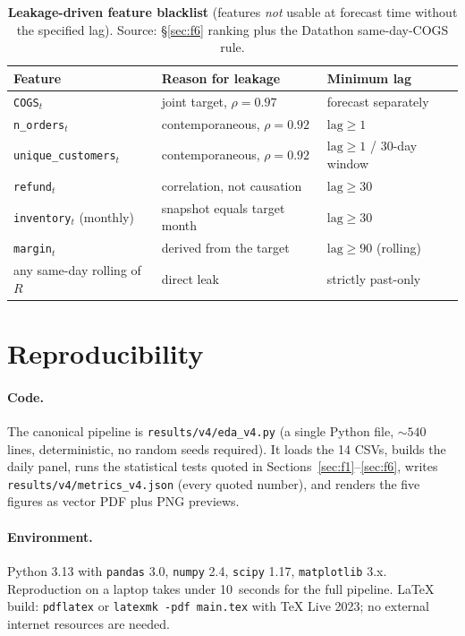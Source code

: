\documentclass{article}
\begin{document}
\begin{table}[h]
  \caption{\textbf{Leakage-driven feature blacklist} (features \emph{not} usable at forecast time without the specified lag). Source: \S\ref{sec:f6} ranking plus the Datathon same-day-COGS rule.}
  \label{tab:blacklist}
  \centering
  \small
  \begin{tabular}{@{}l l l@{}}
    \toprule
    \textbf{Feature} & \textbf{Reason for leakage} & \textbf{Minimum lag} \\
    \midrule
    \texttt{COGS}$_t$                  & joint target, $\rho=0.97$     & forecast separately \\
    \texttt{n\_orders}$_t$             & contemporaneous, $\rho=0.92$  & $\text{lag}\ge 1$ \\
    \texttt{unique\_customers}$_t$     & contemporaneous, $\rho=0.92$  & $\text{lag}\ge 1$ / 30-day window \\
    \texttt{refund}$_t$                & correlation, not causation    & $\text{lag}\ge 30$ \\
    \texttt{inventory}$_t$ (monthly)   & snapshot equals target month  & $\text{lag}\ge 30$ \\
    \texttt{margin}$_t$                & derived from the target       & $\text{lag}\ge 90$ (rolling) \\
    any same-day rolling of $R$        & direct leak                   & strictly past-only \\
    \bottomrule
  \end{tabular}
\end{table}


\section{Reproducibility}
\label{app:repro}

\paragraph{Code.} The canonical pipeline is \texttt{results/v4/eda\_v4.py} (a single Python file, $\sim\!540$ lines, deterministic, no random seeds required). It loads the 14 CSVs, builds the daily panel, runs the statistical tests quoted in Sections~\ref{sec:f1}--\ref{sec:f6}, writes \texttt{results/v4/metrics\_v4.json} (every quoted number), and renders the five figures as vector PDF plus PNG previews.

\paragraph{Environment.} Python 3.13 with \texttt{pandas} 3.0, \texttt{numpy} 2.4, \texttt{scipy} 1.17, \texttt{matplotlib} 3.x. Reproduction on a laptop takes under 10~seconds for the full pipeline. LaTeX build: \texttt{pdflatex} or \texttt{latexmk -pdf main.tex} with TeX Live 2023; no external internet resources are needed.
\end{document}
